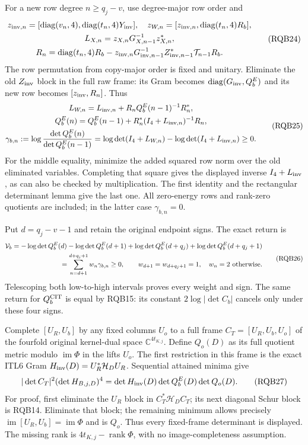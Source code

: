 \documentclass[11pt,a4paper]{article}
\begin{document}
For a new row degree $n\ge q_j-v$, use degree-major row order and
\[
\begin{gathered}
 z_{{\rm inv},n}=[\operatorname{diag}(v_n,4),
                       \operatorname{diag}(t_n,4)Y_{\rm inv}],
 \quad z_{W,n}=[z_{{\rm inv},n},\operatorname{diag}(t_n,4)R_b],\\
 L_{X,n}=z_{X,n}G_{X,n-1}^{-1}z_{X,n}^*,\\
 R_n=\operatorname{diag}(t_n,4)R_b
 -z_{{\rm inv},n}G_{{\rm inv},n-1}^{-1}
                   Z_{{\rm inv},n-1}^*\mathcal T_{n-1}R_b .
\end{gathered}\tag{RQB24}
\]
The row permutation from copy-major order is fixed and unitary.
Eliminate the old $Z_{\rm inv}$ block in the full raw frame:
its Gram becomes $\operatorname{diag}(G_{\rm inv},Q_b^E)$
and its new row becomes $[z_{\rm inv},R_n]$. Thus
\[
\begin{gathered}
 L_{W,n}=L_{{\rm inv},n}
                    +R_nQ_b^E(n-1)^{-1}R_n^*,\\
 Q_b^E(n)=Q_b^E(n-1)
           +R_n^*(I_4+L_{{\rm inv},n})^{-1}R_n,\\
 \gamma_{b,n}:=\log\frac{\det Q_b^E(n)}{\det Q_b^E(n-1)}
       =\log\det(I_4+L_{W,n})-\log\det(I_4+L_{{\rm inv},n})
       \ge0 .
\end{gathered}\tag{RQB25}
\]
For the middle equality, minimize the added squared row norm over
the old eliminated variables. Completing that square gives the
displayed inverse $I_4+L_{\rm inv}$, as can also be checked by
multiplication. The first identity and the rectangular determinant
lemma give the last one. All zero-energy rows and rank-zero
quotients are included; in the latter case $\gamma_{b,n}=0$.

Put $d=q_j-v-1$ and retain the original endpoint signs. The exact return is
\[
\begin{gathered}
 \mathcal V_b=-\log\det Q_b^E(d)-\log\det Q_b^E(d+1)
              +\log\det Q_b^E(d+q_j)+\log\det Q_b^E(d+q_j+1)\\
 \hfill=\sum_{n=d+1}^{d+q_j+1}w_n\gamma_{b,n}\ge0,\qquad
 w_{d+1}=w_{d+q_j+1}=1,\quad w_n=2\ \hbox{otherwise}.
\end{gathered}\tag{RQB26}
\]
Telescoping both low-to-high intervals proves every weight and sign.
The same return for $Q_b^{\rm CIT}$ is equal by RQB15: its
constant $2\log|\det C_b|$ cancels only under these four signs.

Complete $[U_R,U_b]$ by any fixed columns $U_o$ to a full frame
$C_T=[U_R,U_b,U_o]$ of the fourfold original kernel-dual space
$\mathbb C^{4t_{K,j}}$. Define $Q_o(D)$ as its full quotient metric
modulo $\operatorname{im}\Phi$ in the lifts $U_o$.
The first restriction in this frame is the exact ITL6 Gram
$H_{\rm inv}(D)=U_R^*\mathcal H_DU_R$. Sequential attained minima give
\[
 |\det C_T|^2(\det H_{B,j,D})^4
       =\det H_{\rm inv}(D)\det Q_b^E(D)\det Q_o(D).
 \tag{RQB27}
\]
For proof, first eliminate the $U_R$ block in
$C_T^*\mathcal H_DC_T$; its next diagonal Schur block is RQB14.
Eliminate that block; the remaining minimum allows precisely
$\operatorname{im}[U_R,U_b]=\operatorname{im}\Phi$ and is $Q_o$.
Thus every fixed-frame determinant is displayed. The missing rank is
$4t_{K,j}-\operatorname{rank}\Phi$, with no image-completeness assumption.
\end{document}
